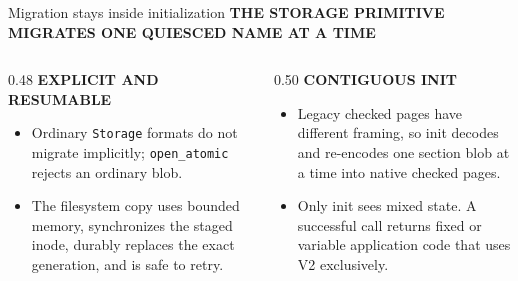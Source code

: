 \documentclass[aspectratio=169,10pt]{beamer}
\newcommand{\eyebrow}[1]{\textcolor{Accent}{\bfseries\scriptsize\MakeUppercase{#1}}}
\begin{document}
\begin{frame}[t]{Migration stays inside initialization}
  \vspace{0.02cm}
  \eyebrow{The storage primitive migrates one quiesced name at a time}

  \vspace{0.08cm}
  \begin{center}
  \end{center}

  \vspace{0.16cm}
  \begin{columns}[T,onlytextwidth]
    \begin{column}{0.48\textwidth}
      \eyebrow{Explicit and resumable}
      \small
      \begin{itemize}\setlength\itemsep{0.03cm}
        \item Ordinary \texttt{Storage} formats do not migrate implicitly; \texttt{open\_atomic} rejects an ordinary blob.
        \item The filesystem copy uses bounded memory, synchronizes the staged inode, durably replaces the exact generation, and is safe to retry.
      \end{itemize}
    \end{column}
    \begin{column}{0.50\textwidth}
      \eyebrow{Contiguous init}
      \small
      \begin{itemize}\setlength\itemsep{0.03cm}
        \item Legacy checked pages have different framing, so init decodes and re-encodes one section blob at a time into native checked pages.
        \item Only init sees mixed state. A successful call returns fixed or variable application code that uses V2 exclusively.
      \end{itemize}
    \end{column}
  \end{columns}


\end{frame}
\end{document}
